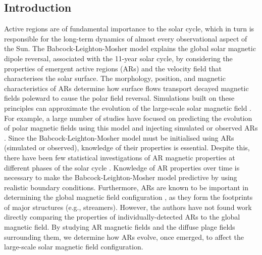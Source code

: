 \documentclass[namedreferences]{solarphysics}
\begin{document}
\begin{article}
\section{Introduction}

Active regions are of fundamental importance to the solar cycle, which in turn is responsible for the long-term dynamics of almost every observational aspect of the Sun. 
The Babcock-Leighton-Mosher model \citep{Babcock:1961,Leighton:1964,Mosher:1977} explains the global solar magnetic dipole reversal, associated with the 11-year solar cycle, by considering the properties of emergent active regions (ARs) and the velocity field that characterises the solar surface. The morphology, position, and magnetic characteristics of ARs determine how surface flows transport decayed magnetic fields poleward to cause the polar field reversal. %
Simulations built on these principles can approximate the evolution of the large-scale solar magnetic field \citep{Leighton:1964,Sheeley:1985,Devore:1986,Wang:1989}. For example, a large number of studies have %
 focused on predicting the evolution of polar magnetic fields using this model and injecting simulated or observed ARs \citep{Devore:1987,schussler:2006,Schrijver:2008b,Wang:2009,Upton:2013}. Since the Babcock-Leighton-Mosher model must be initialised using ARs (simulated or observed), knowledge of their properties is essential. Despite this, there have been few statistical investigations of AR magnetic properties at different phases of the solar cycle \citep{meunier:2003,zharkov:2006}. Knowledge of AR properties over time is necessary to make the Babcock-Leighton-Mosher model predictive by using realistic boundary conditions. Furthermore, ARs are known to be important in determining the global magnetic field configuration \citep{wang:2003a, Schrijver:2003, schussler:2006}, as they form the footprints of major structures (e.g., streamers). However, the authors have not found work directly comparing the properties of individually-detected ARs to the global magnetic field. 
By studying AR magnetic fields and the diffuse plage fields surrounding them, we %
determine how ARs evolve, once emerged, to affect the large-scale solar magnetic field configuration. 


\end{article}
\end{document}
